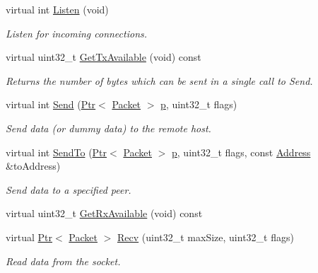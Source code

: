 \begin{DoxyCompactItemize}
virtual int \hyperlink{classns3_1_1NscTcpSocketImpl_ac8279480311e2de5a9d55f283502d04b}{Listen} (void)
\begin{DoxyCompactList}\small\item\em Listen for incoming connections. \end{DoxyCompactList}\item 
virtual uint32\+\_\+t \hyperlink{classns3_1_1NscTcpSocketImpl_a91987b779c1cff89ce618e2aaba011be}{Get\+Tx\+Available} (void) const 
\begin{DoxyCompactList}\small\item\em Returns the number of bytes which can be sent in a single call to Send. \end{DoxyCompactList}\item 
virtual int \hyperlink{classns3_1_1NscTcpSocketImpl_a1623a6154bf55e526dfccdc90edd73bd}{Send} (\hyperlink{classns3_1_1Ptr}{Ptr}$<$ \hyperlink{classns3_1_1Packet}{Packet} $>$ \hyperlink{lte__link__budget__x2__handover__measures_8m_ac9de518908a968428863f829398a4e62}{p}, uint32\+\_\+t flags)
\begin{DoxyCompactList}\small\item\em Send data (or dummy data) to the remote host. \end{DoxyCompactList}\item 
virtual int \hyperlink{classns3_1_1NscTcpSocketImpl_af57597dcb4e66ed155fe9ebea9c7a7da}{Send\+To} (\hyperlink{classns3_1_1Ptr}{Ptr}$<$ \hyperlink{classns3_1_1Packet}{Packet} $>$ \hyperlink{lte__link__budget__x2__handover__measures_8m_ac9de518908a968428863f829398a4e62}{p}, uint32\+\_\+t flags, const \hyperlink{classns3_1_1Address}{Address} \&to\+Address)
\begin{DoxyCompactList}\small\item\em Send data to a specified peer. \end{DoxyCompactList}\item 
virtual uint32\+\_\+t \hyperlink{classns3_1_1NscTcpSocketImpl_a3f7e9f28cc5c78e4e6a056ed230f7ee4}{Get\+Rx\+Available} (void) const 
\item 
virtual \hyperlink{classns3_1_1Ptr}{Ptr}$<$ \hyperlink{classns3_1_1Packet}{Packet} $>$ \hyperlink{classns3_1_1NscTcpSocketImpl_a16e43d62d76c7784a0dcb0b01e3efc68}{Recv} (uint32\+\_\+t max\+Size, uint32\+\_\+t flags)
\begin{DoxyCompactList}\small\item\em Read data from the socket. \end{DoxyCompactList}\item 

\end{DoxyCompactItemize}

